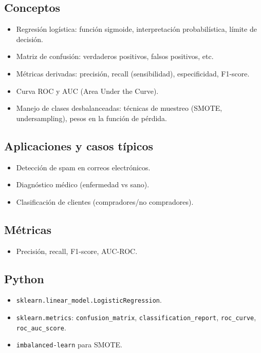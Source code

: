 \documentclass[12pt,a4paper,openany,oneside]{book}
\begin{document}
\subsection{Conceptos}
\begin{itemize}
    \item Regresión logística: función sigmoide, interpretación probabilística, límite de decisión.
    \item Matriz de confusión: verdaderos positivos, falsos positivos, etc.
    \item Métricas derivadas: precisión, recall (sensibilidad), especificidad, F1-score.
    \item Curva ROC y AUC (Area Under the Curve).
    \item Manejo de clases desbalanceadas: técnicas de muestreo (SMOTE, undersampling), pesos en la función de pérdida.
\end{itemize}

\subsection{Aplicaciones y casos típicos}
\begin{itemize}
    \item Detección de spam en correos electrónicos.
    \item Diagnóstico médico (enfermedad vs sano).
    \item Clasificación de clientes (compradores/no compradores).
\end{itemize}

\subsection{Métricas}
\begin{itemize}
    \item Precisión, recall, F1-score, AUC-ROC.
\end{itemize}

\subsection{Python}
\begin{itemize}
    \item \texttt{sklearn.linear\_model.LogisticRegression}.
    \item \texttt{sklearn.metrics}: \texttt{confusion\_matrix}, \texttt{classification\_report}, \texttt{roc\_curve}, \texttt{roc\_auc\_score}.
    \item \texttt{imbalanced-learn} para SMOTE.
\end{itemize}
\end{document}
